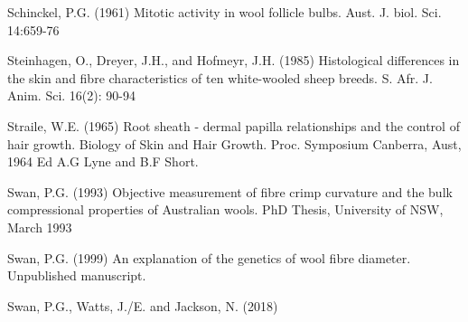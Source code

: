 \documentclass[titlepage]{article}  %
\begin{document}
\begin{thebibliography}{99}
Schinckel, P.G. (1961) Mitotic activity in wool follicle bulbs. Aust. J. biol. Sci. 14:659-76

Steinhagen, O., Dreyer, J.H., and Hofmeyr, J.H. (1985) Histological differences in the skin and fibre characteristics of ten white-wooled sheep breeds. S. Afr. J. Anim. Sci. 16(2): 90-94

Straile, W.E. (1965) Root sheath - dermal papilla relationships and the control of hair growth. Biology of Skin and Hair Growth.  Proc. Symposium Canberra, Aust, 1964 Ed A.G Lyne and B.F Short.

Swan, P.G. (1993) Objective measurement of fibre crimp curvature and the bulk compressional properties of Australian wools. PhD Thesis, University of NSW, March 1993 

Swan, P.G. (1999) An explanation of the genetics of wool fibre diameter. Unpublished manuscript.

Swan, P.G., Watts, J./E. and Jackson, N. (2018)
\end{thebibliography}
\end{document}

